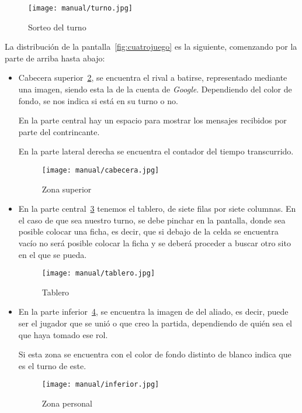 \begin{figure}[H]
	\centering
	\texttt{[image: manual/turno.jpg]}
	\caption{Sorteo del turno}\label{fig:sorteo}
\end{figure}

La distribución de la pantalla~\ref{fig:cuatrojuego} es la siguiente, comenzando por la parte de arriba hasta abajo:

\begin{itemize}
	\item Cabecera superior~\ref{fig:cabecera}, se encuentra el rival a batirse, representado mediante una imagen, siendo esta la de la cuenta de \emph{Google}. Dependiendo del color de fondo, se nos indica si está en su turno o no.
	
	En la parte central hay un espacio para mostrar los mensajes recibidos por parte del contrincante.
	
	En la parte lateral derecha se encuentra el contador del tiempo transcurrido.
	
	 \begin{figure}[H]
	 	\centering
	 	\texttt{[image: manual/cabecera.jpg]}
	 	\caption{Zona superior}\label{fig:cabecera}
	 \end{figure}
 
	\item En la parte central~\ref{fig:tablero} tenemos el tablero, de siete filas por siete columnas. En el caso de que sea nuestro turno, se debe pinchar en la pantalla, donde sea posible colocar una ficha, es decir, que si debajo de la celda se encuentra vacío no será posible colocar la ficha y se deberá proceder a buscar otro sito en el que se pueda.
	
	\begin{figure}[H]
		\centering
		\texttt{[image: manual/tablero.jpg]}
		\caption{Tablero}\label{fig:tablero}
	\end{figure}

	\item En la parte inferior~\ref{fig:inferior}, se encuentra la imagen de del aliado, es decir, puede ser el jugador que se unió o que creo la partida, dependiendo de quién sea el que haya tomado ese rol.
	
	Si esta zona se encuentra con el color de fondo distinto de blanco indica que es el turno de este.
	
	\begin{figure}[H]
		\centering
		\texttt{[image: manual/inferior.jpg]}
		\caption{Zona personal}\label{fig:inferior}
	\end{figure}


\end{itemize}
